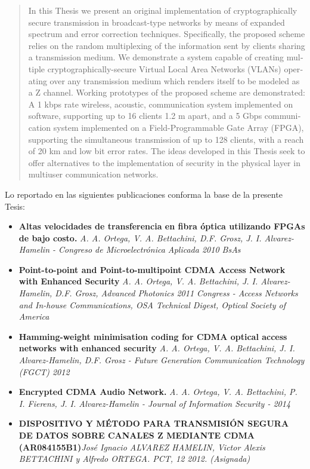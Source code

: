 \documentclass[12pt,twoside,openright]{moddalthesis}
\begin{document}
\begin{otherlanguage}{english} 
\begin{abstract}
In this Thesis we present an original implementation of cryptographically secure transmission in broadcast-type networks by means of expanded spectrum and error correction techniques. Specifically, the proposed scheme relies on the random multiplexing of the information sent by clients sharing a transmission medium. 
We demonstrate a system capable of creating multiple cryptographically-secure Virtual Local Area Networks (VLANs) operating over any transmission medium which renders itself to be modeled as a Z channel.
Working prototypes of the proposed scheme are demonstrated: A 1 kbps rate wireless, acoustic, communication system implemented on software, supporting up to 16 clients 1.2 m apart, and a 5 Gbps communication system implemented on a Field-Programmable Gate Array (FPGA), supporting the simultaneous transmission of up to 128 clients, with a reach of 20 km and low bit error rates. 
The ideas developed in this Thesis seek to offer alternatives to the implementation of security in the physical layer in multiuser communication networks.   
\end{abstract}
\end{otherlanguage}




\begin{listofpubs}
Lo reportado en las siguientes publicaciones conforma la base de la presente Tesis:

\begin{itemize}
\item \textbf{Altas velocidades de transferencia en fibra óptica utilizando FPGAs de bajo costo. } \textit{A. A. Ortega, V. A. Bettachini, D.F. Grosz, J. I. Alvarez-Hamelin - Congreso de Microelectrónica Aplicada 2010 BsAs}
\item \textbf{ Point-to-point and Point-to-multipoint CDMA Access Network with Enhanced Security} \textit{ A. A. Ortega, V. A. Bettachini, J. I. Alvarez-Hamelin, D.F. Grosz, Advanced Photonics 2011 Congress - Access Networks and In-house Communications, OSA Technical Digest, Optical Society of America}
\item \textbf{Hamming-weight minimisation coding for CDMA optical access networks with enhanced security} \textit{ A. A. Ortega, V. A. Bettachini, J. I. Alvarez-Hamelin, D.F. Grosz - Future Generation Communication Technology (FGCT) 2012}
\item \textbf{Encrypted CDMA Audio Network.} \textit{ A. A. Ortega, V. A. Bettachini, P. I. Fierens, J. I. Alvarez-Hamelin -  Journal of Information Security - 2014}
\item \textbf{DISPOSITIVO Y MÉTODO PARA TRANSMISIÓN SEGURA DE DATOS SOBRE CANALES Z MEDIANTE CDMA (AR084155B1)}\textit{José Ignacio ALVAREZ HAMELIN, Victor Alexis BETTACHINI y  Alfredo ORTEGA. PCT, 12 2012. (Asignada)}
\end{itemize}
\end{listofpubs}
\end{document}
